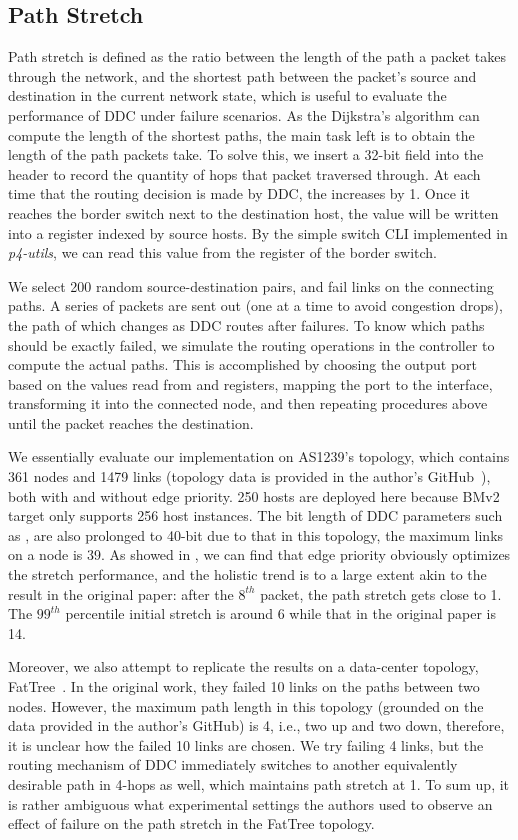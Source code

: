 \subsection{Path Stretch}
Path stretch is defined as the ratio between the length of the path a packet takes through the network, and the shortest path between the packet’s source and destination in the current network state, which is useful to evaluate the performance of DDC under failure scenarios. 
As the Dijkstra's algorithm can compute the length of the shortest paths, the main task left is to obtain the length of the path packets take. 
To solve this, we insert a 32-bit \hp field into the header to record the quantity of hops that packet traversed through. At each time that the routing decision is made by DDC, the \hp increases by 1. Once it reaches the border switch next to the destination host, the value will be written into a \hn register indexed by source hosts. By the simple switch CLI implemented in \textit{p4-utils}, we can read this value from the \hn register of the border switch. 

We select 200 random source-destination pairs, and fail links on the connecting paths. A series of packets are sent out (one at a time to avoid congestion drops), the path of which changes as DDC routes after failures. To know which paths should be exactly failed, we simulate the routing operations in the controller to compute the actual paths. This is accomplished by choosing the output port based on the values read from \ld and \lkst registers, mapping the port to the interface, transforming it into the connected node, and then repeating procedures above until the packet reaches the destination. 

We essentially evaluate our implementation on AS1239's topology, which contains 361 nodes and 1479 links (topology data is provided in the author's GitHub~\cite{ddc-ns3}), both with and without edge priority. 
250 hosts are deployed here because BMv2 target only supports 256 host instances. 
The bit length of DDC parameters such as \ls, \rs are also prolonged to 40-bit due to that in this topology, the maximum links on a node is 39. 
As showed in , we can find that edge priority obviously optimizes the stretch performance, and the holistic trend is to a large extent akin to the result in the original paper: after the $8^{th}$ packet, the path stretch gets close to 1. 
The $99^{th}$ percentile initial stretch is around 6 while that in the original paper is 14. 

Moreover, we also attempt to replicate the results on a data-center topology, FatTree~\cite{FatTree}. 
In the original work, they failed 10 links on the paths between two nodes.
However, the maximum path length in this topology (grounded on the data provided in the author's GitHub) is 4, i.e., two up and two down, therefore, it is unclear how the failed 10 links are chosen.
We try failing 4 links, but the routing mechanism of DDC immediately switches to another equivalently desirable path in 4-hops as well, which maintains path stretch at 1. 
To sum up, it is rather ambiguous what experimental settings the authors used to observe an effect of failure on the path stretch in the FatTree topology.

